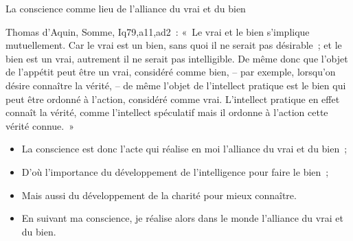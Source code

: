 \documentclass[11pt,xcolor=dvipsname,ignorenonframetext,handout]{beamer}
\begin{document}
\begin{frame}{La conscience comme lieu de l'alliance du vrai et du bien}
    \begin{block}{Thomas d'Aquin, Somme, Iq79,a11,ad2~:}
        \rightskip=0pt\leftskip=0pt
        «~Le vrai et le bien s'implique mutuellement. Car le vrai est un bien, sans quoi il ne serait pas désirable~; et le bien est un vrai, autrement il ne serait pas intelligible. De même donc que l'objet de l'appétit peut être un vrai, considéré comme bien, -- par exemple, lorsqu'on désire connaître la vérité, -- de même l'objet de l'intellect pratique est le bien qui peut être ordonné à l'action, considéré comme vrai. L'intellect pratique en effet connaît la vérité, comme l'intellect spéculatif mais il ordonne à l'action cette vérité connue.~»
    \end{block}
    \begin{itemize}
        \rightskip=0pt\leftskip=0pt
        \item La conscience est donc l'acte qui réalise en moi l'alliance du vrai et du bien~;
        \item D'où l'importance du développement de l'intelligence pour faire le bien~;
        \item Mais aussi du développement de la charité pour mieux connaître.
        \item En suivant ma conscience, je réalise alors dans le monde l'alliance du vrai et du bien.
    \end{itemize}
\end{frame}
\end{document}
